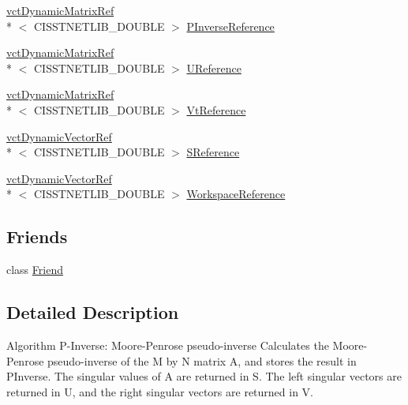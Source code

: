 \begin{DoxyCompactItemize}
\item 
\hyperlink{classvct_dynamic_matrix_ref}{vct\-Dynamic\-Matrix\-Ref}\\*
$<$ C\-I\-S\-S\-T\-N\-E\-T\-L\-I\-B\-\_\-\-D\-O\-U\-B\-L\-E $>$ \hyperlink{classnmr_p_inverse_economy_dynamic_data_a398e793024cec70ccadfa4ba192ac3f6}{P\-Inverse\-Reference}
\item 
\hyperlink{classvct_dynamic_matrix_ref}{vct\-Dynamic\-Matrix\-Ref}\\*
$<$ C\-I\-S\-S\-T\-N\-E\-T\-L\-I\-B\-\_\-\-D\-O\-U\-B\-L\-E $>$ \hyperlink{classnmr_p_inverse_economy_dynamic_data_ab63ec5055abd6748b0bf5dbc06b0ce54}{U\-Reference}
\item 
\hyperlink{classvct_dynamic_matrix_ref}{vct\-Dynamic\-Matrix\-Ref}\\*
$<$ C\-I\-S\-S\-T\-N\-E\-T\-L\-I\-B\-\_\-\-D\-O\-U\-B\-L\-E $>$ \hyperlink{classnmr_p_inverse_economy_dynamic_data_a4a703a5dc3284d415b43501202ed9274}{Vt\-Reference}
\item 
\hyperlink{classvct_dynamic_vector_ref}{vct\-Dynamic\-Vector\-Ref}\\*
$<$ C\-I\-S\-S\-T\-N\-E\-T\-L\-I\-B\-\_\-\-D\-O\-U\-B\-L\-E $>$ \hyperlink{classnmr_p_inverse_economy_dynamic_data_a4c1babef12716a337989755812b539cf}{S\-Reference}
\item 
\hyperlink{classvct_dynamic_vector_ref}{vct\-Dynamic\-Vector\-Ref}\\*
$<$ C\-I\-S\-S\-T\-N\-E\-T\-L\-I\-B\-\_\-\-D\-O\-U\-B\-L\-E $>$ \hyperlink{classnmr_p_inverse_economy_dynamic_data_a251cd42a2dcacbaa6920a08130026bf3}{Workspace\-Reference}
\end{DoxyCompactItemize}

\subsection*{Friends}
\begin{DoxyCompactItemize}
\item 
class \hyperlink{classnmr_p_inverse_economy_dynamic_data_a7f8321d57e81bc613d5dbef3410ba70e}{Friend}
\end{DoxyCompactItemize}


\subsection{Detailed Description}
Algorithm P-\/\-Inverse\-: Moore-\/\-Penrose pseudo-\/inverse Calculates the Moore-\/\-Penrose pseudo-\/inverse of the M by N matrix A, and stores the result in P\-Inverse. The singular values of A are returned in S. The left singular vectors are returned in U, and the right singular vectors are returned in V.

